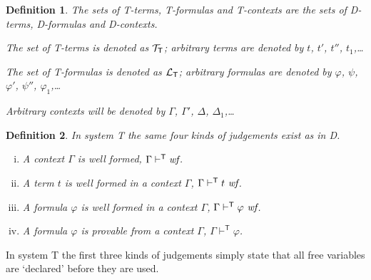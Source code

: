 \documentclass{article}
\newtheorem{definition}{Definition}[section]
\newcommand{\D}{\textsf D}
\newcommand{\T}{\textsf T}
\newcommand{\ok}{\mbox{\em wf}}
\newcommand{\wf}{\ \mbox{\em wf}}
\newcommand{\lang}[1]{\ensuremath{{\cal L}_{\mathsf{#1}}}}
\newcommand{\terms}[1]{\ensuremath{{\cal T}_{\mathsf{#1}}}}
\newcommand{\myvdash}[1]{\ensuremath{\vdash^{\mathsf{#1}}}}
\begin{document}
\begin{definition}\label{defn:Tterms}\label{defn:Tformulas}\label{defn:Tcontexts}
The sets of {\T}-terms, {\T}-formulas and {\T}-contexts are the sets of
{\D}-terms, {\D}-formulas and {\D}-contexts.

The set of {\T}-terms is denoted as {\terms{T}}; arbitrary terms are
denoted by $t$, $t'$, $t''$, $t_1$,\ldots

The set of {\T}-formulas is denoted as {\lang{T}}; arbitrary formulas
are denoted by $\varphi$, $\psi$, $\varphi'$, $\psi''$, $\varphi_1$,\ldots

Arbitrary contexts will be denoted
by $\Gamma$, $\Gamma'$, $\Delta$, $\Delta_1$,\ldots
\end{definition}

\begin{definition}\label{defn:Tjudgement}
In system {\T} the same four kinds of judgements exist as in {\D}.
\begin{enumerate}[(i)]
\item A context $\Gamma$ is well formed, $\Gamma\myvdash{T}\ok$.
\item A term $t$ is well formed in a context $\Gamma$, $\Gamma\myvdash{T}t\wf$.
\item A formula $\varphi$ is well formed in a context $\Gamma$,
$\Gamma\myvdash{T}\varphi\wf$.
\item A formula $\varphi$ is provable from a context $\Gamma$,
$\Gamma\myvdash{T}\varphi$.
\end{enumerate}
\end{definition}

\bigskip\noindent
In system {\T} the first three kinds of judgements simply state that all
free variables are `declared' before they are used.
\end{document}
